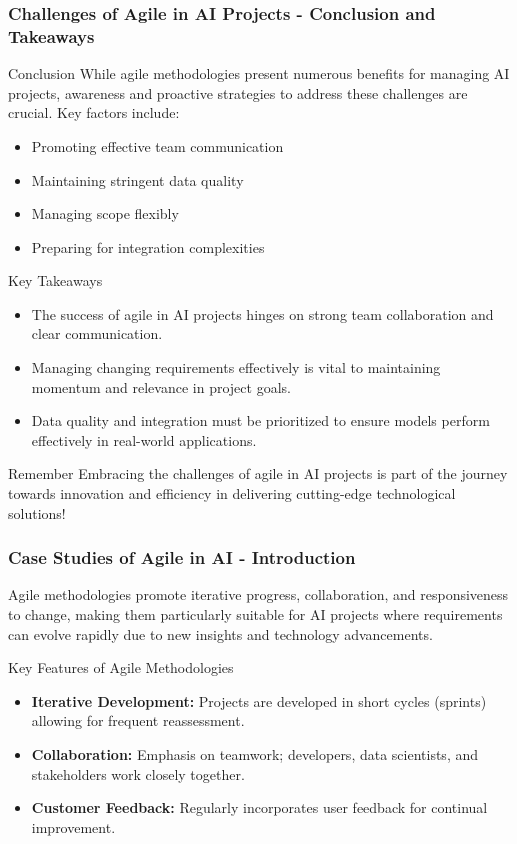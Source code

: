 \documentclass{beamer}
\begin{document}
\begin{frame}[fragile]
    \frametitle{Challenges of Agile in AI Projects - Conclusion and Takeaways}
    \begin{block}{Conclusion}
        While agile methodologies present numerous benefits for managing AI projects, awareness and proactive strategies to address these challenges are crucial. Key factors include:
        \begin{itemize}
            \item Promoting effective team communication
            \item Maintaining stringent data quality
            \item Managing scope flexibly
            \item Preparing for integration complexities
        \end{itemize}
    \end{block}
    \begin{block}{Key Takeaways}
        \begin{itemize}
            \item The success of agile in AI projects hinges on strong team collaboration and clear communication.
            \item Managing changing requirements effectively is vital to maintaining momentum and relevance in project goals.
            \item Data quality and integration must be prioritized to ensure models perform effectively in real-world applications.
        \end{itemize}
    \end{block}
    \begin{block}{Remember}
        Embracing the challenges of agile in AI projects is part of the journey towards innovation and efficiency in delivering cutting-edge technological solutions!
    \end{block}
\end{frame}

\begin{frame}[fragile]
    \frametitle{Case Studies of Agile in AI - Introduction}
    Agile methodologies promote iterative progress, collaboration, and responsiveness to change, making them particularly suitable for AI projects where requirements can evolve rapidly due to new insights and technology advancements.
    
    \begin{block}{Key Features of Agile Methodologies}
        \begin{itemize}
            \item \textbf{Iterative Development:} Projects are developed in short cycles (sprints) allowing for frequent reassessment.
            \item \textbf{Collaboration:} Emphasis on teamwork; developers, data scientists, and stakeholders work closely together.
            \item \textbf{Customer Feedback:} Regularly incorporates user feedback for continual improvement.
        \end{itemize}
    \end{block}
\end{frame}
\end{document}
